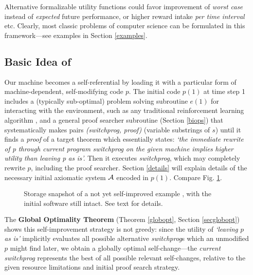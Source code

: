 Alternative formalizable utility functions could favor 
improvement of {\em worst case} instead 
of {\em expected} future performance, 
or higher reward intake {\em per time interval} etc.  
Clearly, most classic problems of computer science
can be formulated in this framework---see examples
in Section \ref{examples}.


\subsection{Basic Idea of \GM}
Our machine becomes a self-referential 
\cite{Goedel:31}
{\em \gmn}
by loading it
with a 
particular form of
machine-dependent, 
self-modifying code $p$. The initial code
$p(1)$ at time step 1
includes a (typically sub-optimal)
problem solving subroutine $e(1)$ for interacting with
the environment, such as any traditional reinforcement learning 
algorithm \cite{Kaelbling:96}, 
and a general proof searcher subroutine 
(Section \ref{biops}) 
that systematically makes pairs
{\em (switchprog, proof)} (variable substrings of $s$)
until it finds a {\em proof} of
a target theorem which essentially states: {\em `the
immediate rewrite of {\em p} through current program {\em switchprog}
on the given machine
implies higher utility than leaving {\em p} as is'.} Then it executes
{\em switchprog}, which may completely rewrite $p$, including
the proof searcher. Section \ref{details} will explain
details of the necessary 
initial axiomatic system $\cal A$ 
encoded in $p(1)$.
Compare Fig. \ref{storage}.
\begin{figure}[hbt]
\centerline{}
\caption{{\small
Storage snapshot of a not yet self-improved example \gmn,
with the initial software still intact. See text for details.
}} \label{storage}
\end{figure}


\noindent
The {\bf Global Optimality Theorem} (Theorem \ref{globopt}, 
Section \ref{secglobopt}) shows 
this self-im\-prove\-ment strategy is not greedy: since the
utility of {\em `leaving $p$ as is'} implicitly evaluates all possible
alternative {\em switchprog}s which an unmodified $p$ might find later,
we obtain a globally optimal self-change---the {\em current switchprog}
represents the best of all possible relevant self-changes, relative
to the given resource limitations and initial proof search strategy.

